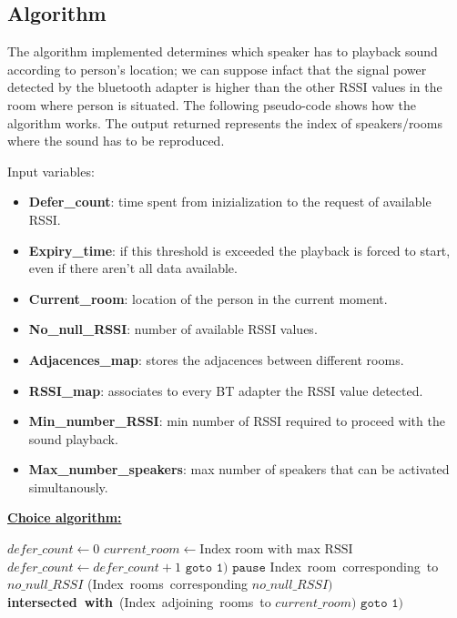 \documentclass[conference]{./IEEEtran}
\begin{document}
\subsection{Algorithm}
The algorithm implemented determines which speaker has to playback sound according to person's location; we can suppose infact that the signal power detected by the bluetooth adapter is higher than the other RSSI values in the room where person is situated. The following pseudo-code shows how the algorithm works. The output returned represents the index of speakers/rooms where the sound has to be reproduced.

Input variables:
\begin{itemize}
\item \textbf{Defer\_count}: time spent from inizialization to the request of available RSSI.
\item \textbf{Expiry\_time}: if this threshold is exceeded the playback is forced to start, even if there aren't all data available. 
\item \textbf{Current\_room}: location of the person in the current moment.
\item \textbf{No\_null\_RSSI}: number of available RSSI values.
\item \textbf{Adjacences\_map}: stores the adjacences between different rooms.
\item \textbf{RSSI\_map}: associates to every BT adapter the RSSI value detected.
\item \textbf{Min\_number\_RSSI}: min number of RSSI required to proceed with the sound playback. 
\item \textbf{Max\_number\_speakers}: max number of speakers that can be activated simultanously.
\end{itemize}
\textbf{\underline{Choice algorithm:}}
\vspace{0.3cm}
\begin{algorithmic}[1]
\STATE $defer\_count \gets 0$
\STATE $current\_room \gets \mbox{Index room with max RSSI}$
\STATE $defer\_count \gets defer\_count + 1$ 
\STATE $\texttt{goto 1)}$  
\ENDIF
 \STATE $\texttt{pause}$ \ENDIF
{} \RETURN \mbox{Index room corresponding to} $no\_null\_RSSI$\ENDIF
{} \RETURN \mbox{(Index rooms corresponding} $no\_null\_RSSI)$ \mbox{\textbf{intersected with} (Index adjoining rooms to} $current\_room)$  \ENDIF
\STATE $\texttt{goto 1)}$
\end{algorithmic}
\end{document}
